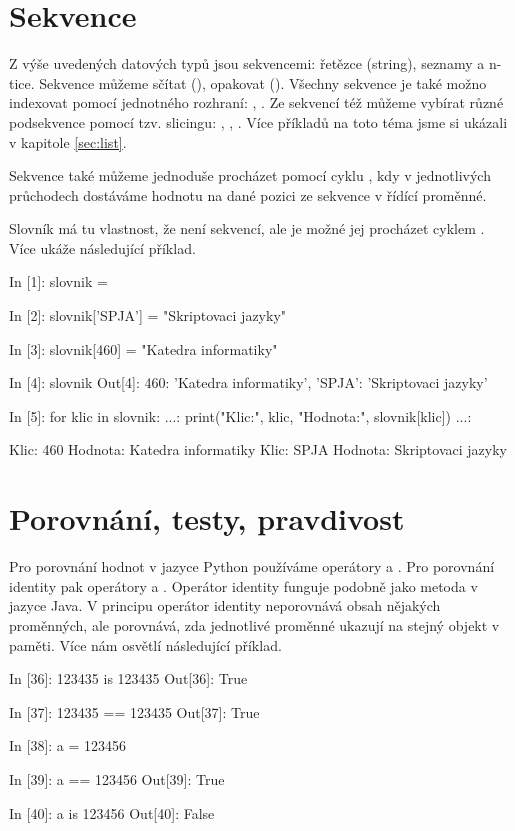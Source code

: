 \section{Sekvence} \label{sec:sequnces}

Z výše uvedených datových typů jsou sekvencemi: řetězce (string), seznamy a n-tice.
Sekvence můžeme sčítat (), opakovat (). Vše\-chny sekvence je také možno indexovat
pomocí jednotného rozhraní: , . Ze sekvencí též můžeme vybírat různé podsekvence pomocí tzv.
slicingu: , , . Více příkladů na toto téma jsme si ukázali v kapitole
\ref{sec:list}.

Sekvence také můžeme jednoduše procházet pomocí cyklu , kdy v jednotlivých průchodech dostáváme hodnotu
na dané pozici ze sekvence v řídící proměnné.

Slovník má tu vlastnost, že není sekvencí, ale je možné jej procházet cyklem . Více ukáže následující příklad.

\begin{python}
In [1]: slovnik = {}

In [2]: slovnik['SPJA'] = "Skriptovaci jazyky"

In [3]: slovnik[460] = "Katedra informatiky"

In [4]: slovnik
Out[4]: {460: 'Katedra informatiky',
         'SPJA': 'Skriptovaci jazyky'}

In [5]: for klic in slovnik:
   ...:     print("Klic:", klic, "Hodnota:", slovnik[klic])
   ...:     

Klic: 460 Hodnota: Katedra informatiky
Klic: SPJA Hodnota: Skriptovaci jazyky
\end{python}

\section{Porovnání, testy, pravdivost}

Pro porovnání hodnot v jazyce Python používáme operátory \kod{==} a \kod{!=}.
Pro porovnání identity pak operátory  a . Operátor identity funguje podobně jako metoda 
v jazyce Java. V principu operátor identity neporovnává obsah nějakých proměnných, ale porovnává, zda jednotlivé
proměnné ukazují na stejný objekt v paměti. Více nám osvětlí následující příklad.

\begin{python}
In [36]: 123435 is 123435
Out[36]: True

In [37]: 123435 == 123435
Out[37]: True

In [38]: a = 123456

In [39]: a == 123456
Out[39]: True

In [40]: a is 123456
Out[40]: False
\end{python}

